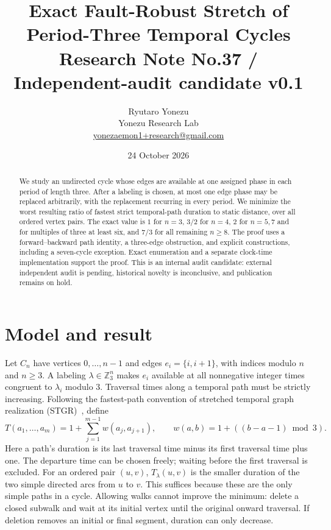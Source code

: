 \documentclass[11pt,a4paper]{article}
\title{\vspace{-1.3em}\textbf{Exact Fault-Robust Stretch of\\Period-Three Temporal Cycles}\\[5pt]\large Research Note No.37 / Independent-audit candidate v0.1}
\author{Ryutaro Yonezu\\Yonezu Research Lab\\\small\href{mailto:yonezaemon1+research@gmail.com}{yonezaemon1+research@gmail.com}}
\date{24 October 2026}
\newcommand{\Z}{\mathbb Z}
\begin{document}
\maketitle
\thispagestyle{fancy}
\begin{abstract}
We study an undirected cycle whose edges are available at one assigned phase in each period of length three. After a labeling is chosen, at most one edge phase may be replaced arbitrarily, with the replacement recurring in every period. We minimize the worst resulting ratio of fastest strict temporal-path duration to static distance, over all ordered vertex pairs. The exact value is $1$ for $n=3$, $3/2$ for $n=4$, $2$ for $n=5,7$ and for multiples of three at least six, and $7/3$ for all remaining $n\ge8$. The proof uses a forward--backward path identity, a three-edge obstruction, and explicit constructions, including a seven-cycle exception. Exact enumeration and a separate clock-time implementation support the proof. This is an internal audit candidate: external independent audit is pending, historical novelty is inconclusive, and publication remains on hold.
\end{abstract}

\section{Model and result}
Let $C_n$ have vertices $0,\ldots,n-1$ and edges $e_i=\{i,i+1\}$, with indices modulo $n$ and $n\ge3$. A labeling $\lambda\in\Z_3^n$ makes $e_i$ available at all nonnegative integer times congruent to $\lambda_i$ modulo $3$. Traversal times along a temporal path must be strictly increasing. Following the fastest-path convention of stretched temporal graph realization (STGR)~\cite{mertzios}, define
\begin{equation}
 T(a_1,\ldots,a_m)=1+\sum_{j=1}^{m-1}w(a_j,a_{j+1}),\qquad
 w(a,b)=1+((b-a-1)\bmod3).
 \label{eq:duration}
\end{equation}
Here a path's duration is its last traversal time minus its first traversal time plus one. The departure time can be chosen freely; waiting before the first traversal is excluded. For an ordered pair $(u,v)$, $T_\lambda(u,v)$ is the smaller duration of the two simple directed arcs from $u$ to $v$. This suffices because these are the only simple paths in a cycle. Allowing walks cannot improve the minimum: delete a closed subwalk and wait at its initial vertex until the original onward traversal. If deletion removes an initial or final segment, duration can only decrease.
\end{document}
